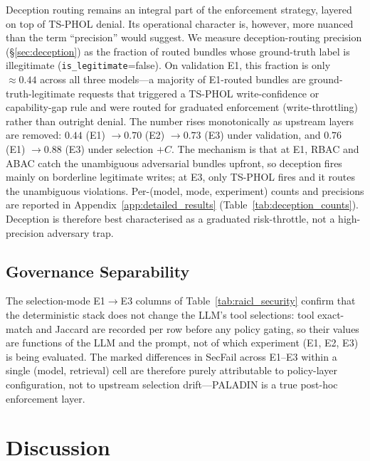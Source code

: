 \documentclass[10pt,a4paper,twocolumn]{article}
\begin{document}
Deception routing remains an integral part of the enforcement strategy, layered on top of TS-PHOL denial. Its operational character is, however, more nuanced than the term ``precision'' would suggest. We measure deception-routing precision (\S\ref{sec:deception}) as the fraction of routed bundles whose ground-truth label is illegitimate (\texttt{is\_legitimate}=false). On validation E1, this fraction is only $\approx 0.44$ across all three models---a majority of E1-routed bundles are ground-truth-legitimate requests that triggered a TS-PHOL write-confidence or capability-gap rule and were routed for graduated enforcement (write-throttling) rather than outright denial. The number rises monotonically as upstream layers are removed: $0.44$ (E1) $\to 0.70$ (E2) $\to 0.73$ (E3) under validation, and $0.76$ (E1) $\to 0.88$ (E3) under selection $+C$. The mechanism is that at E1, RBAC and ABAC catch the unambiguous adversarial bundles upfront, so deception fires mainly on borderline legitimate writes; at E3, only TS-PHOL fires and it routes the unambiguous violations. Per-(model, mode, experiment) counts and precisions are reported in Appendix~\ref{app:detailed_results} (Table~\ref{tab:deception_counts}). Deception is therefore best characterised as a graduated risk-throttle, not a high-precision adversary trap.

\subsection{Governance Separability}
\label{sec:separability}

The selection-mode E1$\to$E3 columns of Table~\ref{tab:raicl_security} confirm that the deterministic stack does not change the LLM's tool selections: tool exact-match and Jaccard are recorded per row before any policy gating, so their values are functions of the LLM and the prompt, not of which experiment (E1, E2, E3) is being evaluated. The marked differences in SecFail across E1--E3 within a single (model, retrieval) cell are therefore purely attributable to policy-layer configuration, not to upstream selection drift---PALADIN is a true post-hoc enforcement layer.

\FloatBarrier
\section{Discussion}
\label{sec:discussion}
\end{document}
